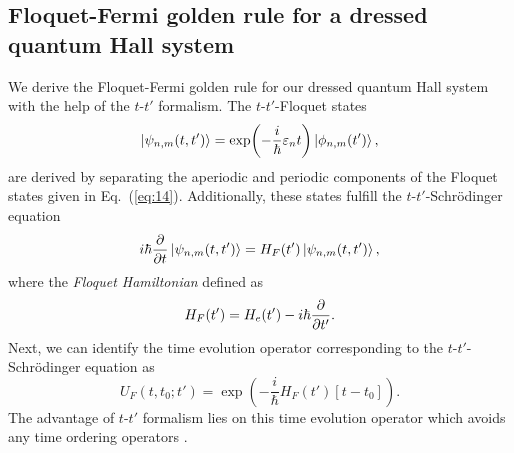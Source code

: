\documentclass[
 reprint,
 amsmath,amssymb,
 aps,
 prb,
]{revtex4-2}
\begin{document}
\begin{appendix}
\section{\label{appendix_c} Floquet-Fermi golden rule for a dressed quantum  Hall system}

We derive the Floquet-Fermi golden rule for our dressed quantum Hall system with the help of the $t$-$t'$ formalism. The $t$-$t'$-Floquet states \cite{grifoni98,wackerl20}
\begin{equation} \label{eq:c1}
  \ket{\psi_{n,m}(t,t')} =
  \exp(-\frac{i}{\hbar}\varepsilon_{n} t)\ket{\phi_{n,m}(t')},
\end{equation}
are derived by separating the aperiodic and periodic components of the Floquet states given in Eq.~(\ref{eq:14}). Additionally, these states fulfill the $t$-$t'$-Schrödinger equation \cite{grifoni98,wackerl20}
\begin{equation} \label{eq:c2}
  i \hbar \pdv{t}\ket{\psi_{n,m}(t,t')} =
  H_F(t') \ket{\psi_{n,m}(t,t')},
\end{equation}
where the \textit{Floquet Hamiltonian} defined as
\begin{equation} \label{eq:c3}
  H_F(t') =
  H_e(t') - i\hbar \pdv{t'}.
\end{equation}
Next, we can identify the time evolution operator corresponding to the $t$-$t'$-Schrödinger equation as
\begin{equation} \label{eq:c4}
  U_F(t,t_0;t') = \exp(-\frac{i}{\hbar}H_F(t')\left[t-t_0 \right]).
\end{equation}
The advantage of $t$-$t'$ formalism lies on this time evolution operator which avoids any time ordering operators \cite{wackerl20}.


\end{appendix}
\end{document}
